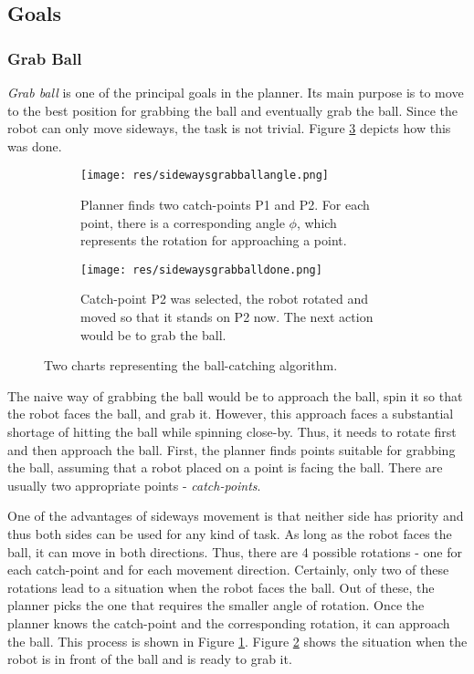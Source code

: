 \subsection{Goals}


\subsubsection{Grab Ball}

\emph{Grab ball} is one of the principal goals in the planner. Its main purpose
is to move to the best position for grabbing the ball and eventually grab the
ball. Since the robot can only move sideways, the task is not trivial. Figure
\ref{fig:sidewaysgrabball} depicts how this was done.

\begin{figure}[H]
	\begin{center}
	\begin{subfigure}{0.5\textwidth}
  		\texttt{[image: res/sidewaysgrabballangle.png]}
  		\caption{Planner finds two catch-points P1 and P2. For each point, there is a corresponding angle $\phi$, which represents the rotation for approaching a point.}
  		\label{fig:sidewaysgrabballangle}
	\end{subfigure}%
	\begin{subfigure}{0.5\textwidth}
  		\texttt{[image: res/sidewaysgrabballdone.png]}
  		\caption{Catch-point P2 was selected, the robot rotated and moved so that it stands on P2 now. The next action would be to grab the ball. }
  		\label{fig:sidewaysgrabballdone}
	\end{subfigure}%
	
	\caption{Two charts representing the ball-catching algorithm. }
	\label{fig:sidewaysgrabball}
	\end{center}
\end{figure}


The naive way of grabbing the ball would be to approach the ball, spin it so
that the robot faces the ball, and grab it. However, this approach faces a
substantial shortage of hitting the ball while spinning close-by. Thus, it
needs to rotate first and then approach the ball. First, the planner finds
points suitable for grabbing the ball, assuming that a robot placed on a point
is facing the ball. There are usually two appropriate points -
\emph{catch-points}. 

One of the advantages of sideways movement is that neither side has priority
and thus both sides can be used for any kind of task. As long as the robot
faces the ball, it can move in both directions. Thus, there are 4 possible
rotations - one for each catch-point and for each movement direction.
Certainly, only two of these rotations lead to a situation when the robot faces
the ball. Out of these, the planner picks the one that requires the smaller
angle of rotation. Once the planner knows the catch-point and the corresponding
rotation, it can approach the ball. This process is shown in Figure
\ref{fig:sidewaysgrabballangle}. Figure \ref{fig:sidewaysgrabballdone} shows
the situation when the robot is in front of the ball and is ready to grab it.

